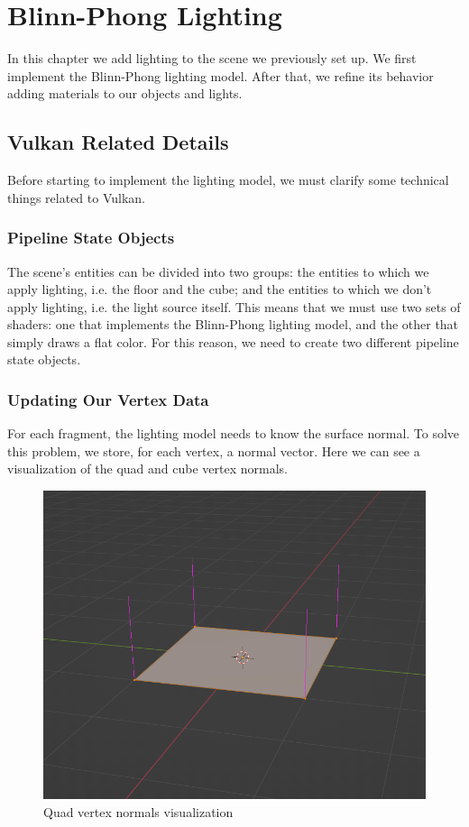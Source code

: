 \chapter{Blinn-Phong Lighting}

In this chapter we add lighting to the scene we previously set up.
We first implement the Blinn-Phong lighting model.
After that, we refine its behavior adding materials to our objects and lights.

\section{Vulkan Related Details}

Before starting to implement the lighting model, we must clarify some technical
things related to Vulkan.

\subsection{Pipeline State Objects}

The scene's entities can be divided into two groups: the entities to which we
apply lighting, i.e. the floor and the cube; and the entities to which we
don't apply lighting, i.e. the light source itself.
This means that we must use two sets of shaders: one that implements
the Blinn-Phong lighting model, and the other that simply draws a flat color.
For this reason, we need to create two different pipeline state objects.

\subsection{Updating Our Vertex Data}

For each fragment, the lighting model needs to know the surface normal.
To solve this problem, we store, for each vertex, a normal vector.
Here we can see a visualization of the quad and cube vertex normals.

\begin{figure}[H]
    \centering
    \includegraphics[scale=0.40]{images/ChBlinnPhong/QuadVertexNormals.png}
    \caption{Quad vertex normals visualization}
    \label{fig::QuadVertexNormals}
\end{figure}

